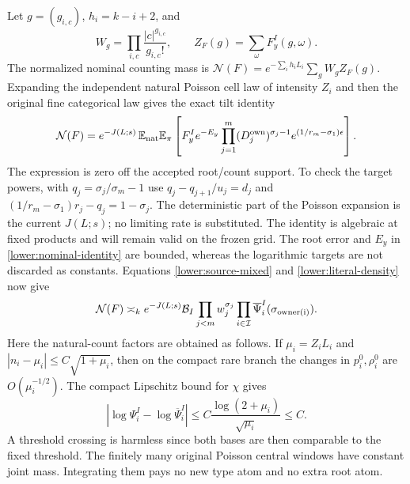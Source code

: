 Let $g=(g_{i,c})$, $h_i=k-i+2$, and
\[
 W_g=\prod_{i,c}\frac{|c|^{g_{i,c}}}{g_{i,c}!},\qquad
 Z_F(g)=\sum_{\omega}F_y^I(g,\omega).
\]
The normalized nominal counting mass is
$\mathcal N(F)=e^{-\sum_i h_iL_i}\sum_gW_gZ_F(g)$.
Expanding the independent natural Poisson cell law of intensity $Z_i$
and then the original fine categorical law gives the exact tilt
identity
\begin{equation}
 \mathcal N(F)=e^{-J(L;s)}\,
 \mathbb E_{\rm nat}\mathbb E_\pi\left[
 F_y^I e^{-E_y}
 \prod_{j=1}^m(D_j^{\rm own})^{\sigma_j-1}
 e^{(1/r_m-\sigma_1)\epsilon}\right].
 \label{lower:nominal-identity}
\end{equation}
The expression is zero off the accepted root/count support.
To check the target powers, with $q_j=\sigma_j/\sigma_m-1$ use
$q_j-q_{j+1}/u_j=d_j$ and
$(1/r_m-\sigma_1)r_j-q_j=1-\sigma_j$.
The deterministic part of the Poisson expansion is the current
$J(L;s)$; no limiting rate is substituted.  The identity is algebraic
at fixed products and will remain valid on the frozen grid.
The root error and $E_y$ in \eqref{lower:nominal-identity} are bounded,
whereas the logarithmic targets are not discarded as constants.
Equations \eqref{lower:source-mixed} and
\eqref{lower:literal-density} now give
\begin{equation}
 \mathcal N(F)\asymp_k e^{-J(L;s)}\mathcal B_I
        \prod_{j<m}w_j^{\sigma_j}
        \prod_{i\in\mathcal I}\overline\Psi_i^I(\sigma_{\rm owner(i)}).
 \label{lower:nominal-mass}
\end{equation}
Here the natural-count factors are obtained as follows.  If
$\mu_i=Z_iL_i$ and $|n_i-\mu_i|\leq C\sqrt{1+\mu_i}$, then on the
compact rare branch the changes in $p_i^0,\rho_i^0$ are
$O(\mu_i^{-1/2})$.  The compact Lipschitz bound for $\chi$ gives
\[
 |\log\Psi_i^I-\log\overline\Psi_i^I|
       \leq C\frac{\log(2+\mu_i)}{\sqrt{\mu_i}}\leq C.
\]
A threshold crossing is harmless since both bases are then comparable
to the fixed threshold.  The finitely many original Poisson central
windows have constant joint mass.  Integrating them pays no new type
atom and no extra root atom.


